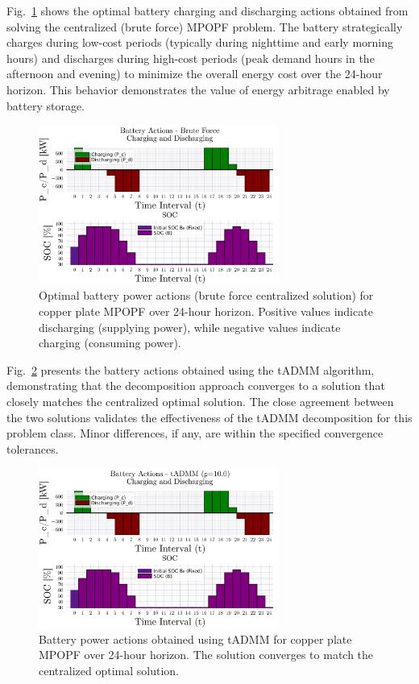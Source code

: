 Fig.~\ref{fig:battery_actions_copper_plate} shows the optimal battery charging and discharging actions obtained from solving the centralized (brute force) MPOPF problem. The battery strategically charges during low-cost periods (typically during nighttime and early morning hours) and discharges during high-cost periods (peak demand hours in the afternoon and evening) to minimize the overall energy cost over the 24-hour horizon. This behavior demonstrates the value of energy arbitrage enabled by battery storage.

\begin{figure}[h]
    \centering
    \includegraphics[width=0.7\textwidth]{figures/battery-actions-copper-plate-T24-bf.png}
    \caption{Optimal battery power actions (brute force centralized solution) for copper plate MPOPF over 24-hour horizon. Positive values indicate discharging (supplying power), while negative values indicate charging (consuming power).}
    \label{fig:battery_actions_copper_plate}
\end{figure}

Fig.~\ref{fig:battery_actions_tadmm} presents the battery actions obtained using the tADMM algorithm, demonstrating that the decomposition approach converges to a solution that closely matches the centralized optimal solution. The close agreement between the two solutions validates the effectiveness of the tADMM decomposition for this problem class. Minor differences, if any, are within the specified convergence tolerances.

\begin{figure}[h]
    \centering
    \includegraphics[width=0.7\textwidth]{figures/battery-actions-copper-plate-T24-tadmm.png}
    \caption{Battery power actions obtained using tADMM for copper plate MPOPF over 24-hour horizon. The solution converges to match the centralized optimal solution.}
    \label{fig:battery_actions_tadmm}
\end{figure}


